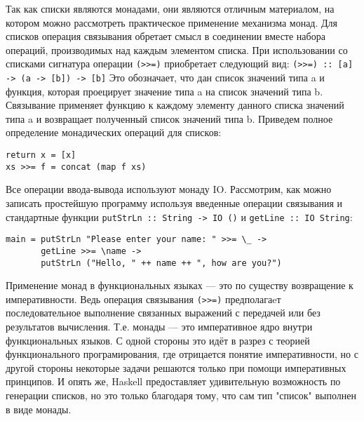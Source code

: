 \documentclass[a4paper]{article}
\begin{document}
Так как списки являются монадами, они являются отличным материалом, на котором
можно рассмотреть практическое применение механизма монад.
Для списков операция связывания обретает смысл в соединении вместе
набора операций, производимых над каждым элементом списка. При
использовании со списками сигнатура операции \verb|(>>=)| приобретает
следующий вид: \verb|(>>=) :: [a] -> (a -> [b]) -> [b]|
Это обозначает, что дан список значений типа a и функция, которая
проецирует значение типа a на список значений типа b. Связывание
применяет функцию к каждому элементу данного списка значений типа a и
возвращает полученный список значений типа b. Приведем полное
определение монадических операций для списков:
\begin{verbatim}
return x = [x]
xs >>= f = concat (map f xs)
\end{verbatim}

Все операции ввода-вывода используют монаду IO. Рассмотрим, как можно
записать простейшую программу используя введенные операции связывания
и стандартные функции \verb|putStrLn :: String -> IO ()| и
\verb|getLine :: IO String|:
\begin{verbatim}
main = putStrLn "Please enter your name: " >>= \_ ->
       getLine >>= \name ->
       putStrLn ("Hello, " ++ name ++ ", how are you?")
\end{verbatim}

Применение монад в функциональных языках — это по существу возвращение
к императивности. Ведь операция связывания \verb|(>>=)| предполагаeт
последовательное выполнение связанных выражений с передачей или без
результатов вычисления. Т.е. монады — это императивное ядро внутри
функциональных языков. С одной стороны это идёт в разрез с теорией
функционального програмирования, где отрицается понятие
императивности, но с другой стороны некоторые задачи решаются только
при помощи императивных принципов. И опять же, Haskell предоставляет
удивительную возможность по генерации списков, но это только благодаря
тому, что сам тип "список" выполнен в виде монады.
\end{document}
